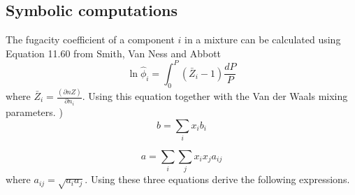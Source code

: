 \documentclass[12pt, A4paper]{article}
\newcounter{parameters}
\begin{document}
\subsection{Symbolic computations}
The fugacity coefficient of a component $i$ in a mixture can be calculated using Equation 11.60 from Smith, Van Ness and Abbott \citep[p. 404]{smith2005introduction} 
\begin{equation} \label{eq:phi_i}
\ln{\hat{\phi}_i} = \int^P_0 (\bar{Z}_i - 1) \frac{d P}{P}
\end{equation}
where $\bar{Z}_i  = \frac{\left( \partial n Z \right)}{\partial n_i}$. Using this equation together with the Van der Waals mixing parameters. \citep[p. 561,  Equations 14.42 and 14.43]{smith2005introduction})
\begin{equation} \label{eq:b_mix}
b = \sum_{i} x_i b_i
\end{equation}

\begin{equation} \label{eq:a_mix}
a = \sum_{i}\sum_{j} x_i x_j a_{ij}
\end{equation}
 where $a_{ij} = \sqrt{a_i a_j}$. Using these three equations derive the following expressions.
\end{document}

